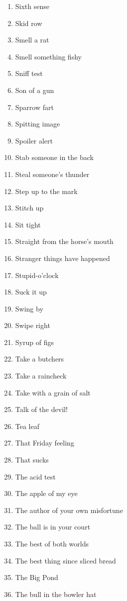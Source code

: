 \begin{enumerate}
        \item  Sixth sense
        \item  Skid row
        \item  Smell a rat
        \item  Smell something fishy
        \item  Sniff test
        \item  Son of a gun
        \item  Sparrow fart
        \item  Spitting image
        \item  Spoiler alert
        \item  Stab someone in the back
        \item  Steal someone's thunder
        \item  Step up to the mark
        \item  Stitch up
        \item  Sit tight
        \item  Straight from the horse's mouth
        \item  Stranger things have happened
        \item  Stupid-o'clock
        \item  Suck it up
        \item  Swing by
        \item  Swipe right
        \item  Syrup of figs
        \item  Take a butchers
        \item  Take a raincheck
        \item  Take with a grain of salt
        \item  Talk of the devil!
        \item  Tea leaf
        \item  That Friday feeling
        \item  That sucks
        \item  The acid test
        \item  The apple of my eye
        \item  The author of your own misfortune
        \item  The ball is in your court
        \item  The best of both worlds
        \item  The best thing since sliced bread
        \item  The Big Pond
        \item  The bull in the bowler hat

\end{enumerate}
